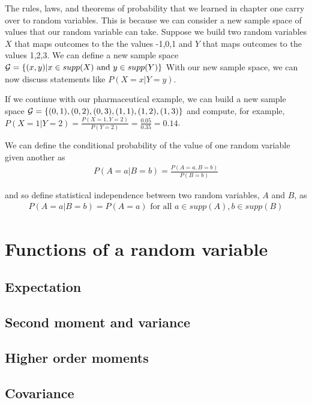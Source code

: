 The rules, laws, and theorems of probability that we learned in chapter one carry over to random variables.
This is because we can consider a new sample space of values that our random variable can take. 
Suppose we build two random variables $X$ that maps outcomes to the the values -1,0,1 and $Y$ that maps outcomes to the values 1,2,3. 
We can define a new sample space $\mathcal{G} = \{(x,y) | x \in supp(X) \text{ and } y \in supp(Y) \}$
With our new sample space, we can now discuss statements like $P(X = x | Y = y)$. 

\ex If we continue with our pharmaceutical example, we can build a new sample space $\mathcal{G} = \{(0,1),(0,2),(0,3),(1,1),(1,2),(1,3)\}$ and compute, for example, $P(X=1 | Y=2) = \frac{P(X=1,Y=2)}{P(Y=2)} = \frac{0.05}{0.35} = 0.14$.

We can define the conditional probability of the value of one random variable given another as 
\begin{align}
    P(A =a | B =b) = \frac{P(A=a,B=b)}{P(B=b)}
\end{align}

and so define statistical independence between two random variables, $A$ and $B$, as 
\begin{align}
    P(A = a | B=b) = P(A = a) \text{ for all } a \in supp(A),b \in supp(B)    
\end{align}


\section{Functions of a random variable}

\subsection{Expectation}

\subsection{Second moment and variance}

\subsection{Higher order moments}

\subsection{Covariance}

